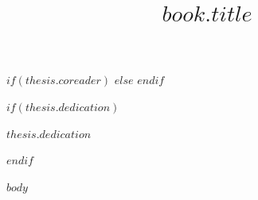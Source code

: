 \documentclass[11pt,a4paper,oneside]{report}
\numberwithin{equation}{chapter}
\numberwithin{equation}{subsection}
\numberwithin{equation}{chapter}
\begin{document}






$if(thesis.coreader)$
$else$
\alternatereaderprefix{}%
$endif$

\title{$book.title$}

\maketitle
\clearpage


$if(thesis.dedication)$
\markright{}
\begin{center}
  $thesis.dedication$
\end{center}
\clearpage
$endif$

%
%
%
%

$body$


\clearpage

\end{document}
